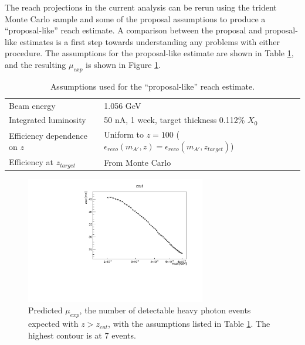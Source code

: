 The reach projections in the current analysis can be rerun using the trident Monte Carlo sample and some of the proposal assumptions to produce a ``proposal-like'' reach estimate.
A comparison between the proposal and proposal-like estimates is a first step towards understanding any problems with either procedure.
The assumptions for the proposal-like estimate are shown in Table \ref{tab:mc_assumptions}, and the resulting $\mu_{exp}$ is shown in Figure \ref{fig:mc_detectable}.

\begin{table}[ht]
    \begin{center}
        \caption{Assumptions used for the ``proposal-like'' reach estimate.}
        \begin{tabular}{lp{}}
            \hline \hline
            Beam energy & 1.056 GeV \\
            Integrated luminosity & 50 nA, 1 week, target thickness 0.112\% $X_0$ \\
            Efficiency dependence on $z$ & Uniform to $z=100$ ($\epsilon_{reco}(m_{A'},z) = \epsilon_{reco}(m_{A'},z_{target})$) \\
            Efficiency at $z_{target}$ & From Monte Carlo \\
            \hline \hline
        \end{tabular}
        \label{tab:mc_assumptions} 
    \end{center}
\end{table}

\begin{figure}[ht]
\begin{center}
    \includegraphics[width=0.7\textwidth,page=16,angle=-90]{vertexing/figs/mc_week_mres_uniform_nosignal_output}
\end{center}
    \caption{Predicted $\mu_{exp}$, the number of detectable heavy photon events expected with $z>z_{cut}$, with the assumptions listed in Table \ref{tab:mc_assumptions}. The highest contour is at 7 events.}
    \label{fig:mc_detectable}
\end{figure}

